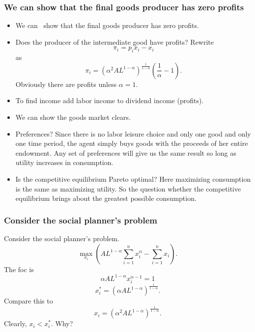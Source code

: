 \documentclass[aspectratio=169]{ltx-talk}
\begin{document}
\begin{frame}
\frametitle{We can show that the final goods producer has zero profits}
\begin{itemize}
\item We can \ show that the final goods producer has zero profits.

\item Does the producer of the intermediate good have profits? Rewrite%
\begin{equation*}
\pi _{i}=p_{i}x_{i}-x_{i}
\end{equation*}%
as%
\begin{equation*}
\pi _{i}=\left( \alpha ^{2}AL^{1-\alpha }\right) ^{\frac{1}{1-\alpha }%
}\left( \frac{1}{\alpha }-1\right) .
\end{equation*}%
Obviously there are profits unless $\alpha =1.$

\item To find income add labor income to dividend income (profits).

\item We can show the goods market clears.

\item Preferences? Since there is no labor leisure choice and only one good
and only one time period, the agent simply buys goods with the proceeds of
her entire endowment. Any set of preferences will give us the same result so
long as utility increases in consumption.

\item Is the competitive equilibrium Pareto optimal? Here maximizing
consumption is the same as maximizing utility. So the question whether the
competitive equilibrium brings about the greatest possible consumption.
\end{itemize}
\end{frame}

\begin{frame}
\frametitle{Consider the social planner{'}s problem}
Consider the social planner's problem. 
\begin{equation*}
\underset{x_{i}}{\max }\left( AL^{1-\alpha }\overset{n}{\underset{i=1}{\sum }%
}x_{i}^{\alpha }-\overset{n}{\underset{i=1}{\sum }}x_{i}\right) .
\end{equation*}%
The foc is 
\begin{equation*}
\alpha AL^{1-\alpha }x_{i}^{\alpha -1}=1
\end{equation*}%
\begin{equation*}
x_{i}^{\ast }=\left( \alpha AL^{1-\alpha }\right) ^{\frac{1}{1-\alpha }}.
\end{equation*}%
Compare this to 
\begin{equation*}
x_{i}=\left( \alpha ^{2}AL^{1-\alpha }\right) ^{\frac{1}{1-\alpha }}.
\end{equation*}%
Clearly, $x_{i}<x_{i}^{\ast }$. Why?
\end{frame}
\end{document}

